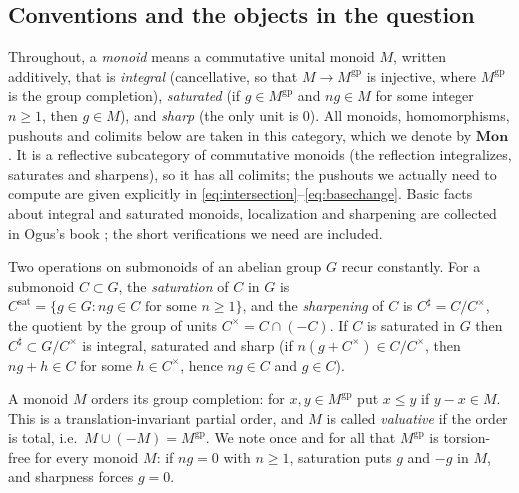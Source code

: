 \documentclass[11pt]{article}
\newcommand{\gp}{\mathrm{gp}}
\newcommand{\sat}{\mathrm{sat}}
\theoremstyle{definition}
\theoremstyle{remark}
\begin{document}
\subsection{Conventions and the objects in the question}
\label{sec:conventions}

Throughout, a \emph{monoid} means a commutative unital monoid \(M\), written
additively, that is
\emph{integral} (cancellative, so that \(M\to M^{\gp}\) is injective, where
\(M^{\gp}\) is the group completion),
\emph{saturated} (if \(g\in M^{\gp}\) and \(ng\in M\) for some integer
\(n\ge1\), then \(g\in M\)), and
\emph{sharp} (the only unit is \(0\)).
All monoids, homomorphisms, pushouts and colimits below are taken in this
category, which we denote by \(\mathbf{Mon}\).  It is a reflective
subcategory of commutative monoids (the reflection integralizes, saturates
and sharpens), so it has all colimits; the pushouts we actually need to
compute are given explicitly in
\eqref{eq:intersection}--\eqref{eq:basechange}.  Basic facts about
integral and saturated monoids, localization and sharpening are collected in
Ogus's book \cite[Ch.~I, \S\S1.3--1.4]{ogus}; the short verifications we need
are included.

Two operations on submonoids of an abelian group \(G\) recur constantly.
For a submonoid \(C\subset G\), the \emph{saturation} of \(C\) in \(G\) is
\(C^{\sat}=\{g\in G:ng\in C\text{ for some }n\ge1\}\),
and the \emph{sharpening} of \(C\) is \(C^\sharp=C/C^\times\), the quotient by
the group of units \(C^\times=C\cap(-C)\).  If \(C\) is saturated in \(G\)
then \(C^\sharp\subset G/C^\times\) is integral, saturated and sharp
(if \(n(g+C^\times)\in C/C^\times\), then \(ng+h\in C\) for some
\(h\in C^\times\), hence \(ng\in C\) and \(g\in C\)).

A monoid \(M\) orders its group completion: for \(x,y\in M^{\gp}\) put
\(x\le y\) if \(y-x\in M\).  This is a translation-invariant partial order,
and \(M\) is called \emph{valuative} if the order is total, i.e.\
\(M\cup(-M)=M^{\gp}\).  We note once and for all that \(M^{\gp}\) is
torsion-free for every monoid \(M\): if \(ng=0\) with \(n\ge1\), saturation
puts \(g\) and \(-g\) in \(M\), and sharpness forces \(g=0\).
\end{document}
